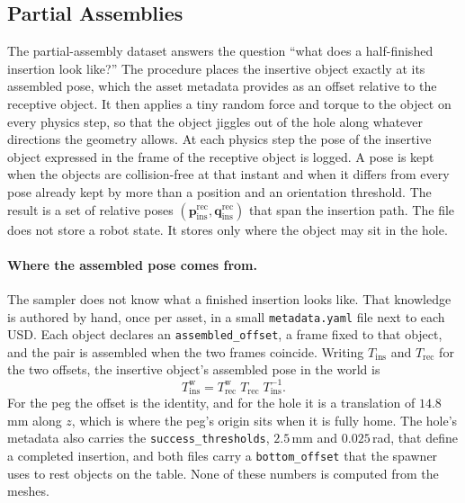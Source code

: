 \documentclass{article}
\newcommand{\Tf}[2]{T^{#1}_{#2}}
\newcommand{\w}{\mathrm{w}}
\newcommand{\code}[1]{\texttt{#1}}
\begin{document}
\subsection{Partial Assemblies}
\label{sec:partial}

The partial-assembly dataset answers the question ``what does a half-finished insertion look like?'' The procedure places the insertive object exactly at its assembled pose, which the asset metadata provides as an offset relative to the receptive object. It then applies a tiny random force and torque to the object on every physics step, so that the object jiggles out of the hole along whatever directions the geometry allows. At each physics step the pose of the insertive object expressed in the frame of the receptive object is logged. A pose is kept when the objects are collision-free at that instant and when it differs from every pose already kept by more than a position and an orientation threshold. The result is a set of relative poses $(\bm p^{\mathrm{rec}}_{\mathrm{ins}},\bm q^{\mathrm{rec}}_{\mathrm{ins}})$ that span the insertion path. The file does not store a robot state. It stores only where the object may sit in the hole.

\paragraph{Where the assembled pose comes from.}
The sampler does not know what a finished insertion looks like. That knowledge is authored by hand, once per asset, in a small \code{metadata.yaml} file next to each USD. Each object declares an \code{assembled\_offset}, a frame fixed to that object, and the pair is assembled when the two frames coincide. Writing $T_{\mathrm{ins}}$ and $T_{\mathrm{rec}}$ for the two offsets, the insertive object's assembled pose in the world is
\begin{equation}
  \Tf{\w}{\mathrm{ins}} = \Tf{\w}{\mathrm{rec}}\; T_{\mathrm{rec}}\; T_{\mathrm{ins}}^{-1}.
  \label{eq:assembled}
\end{equation}
For the peg the offset is the identity, and for the hole it is a translation of $14.8$\,mm along $z$, which is where the peg's origin sits when it is fully home. The hole's metadata also carries the \code{success\_thresholds}, $2.5$\,mm and $0.025$\,rad, that define a completed insertion, and both files carry a \code{bottom\_offset} that the spawner uses to rest objects on the table. None of these numbers is computed from the meshes.
\end{document}
